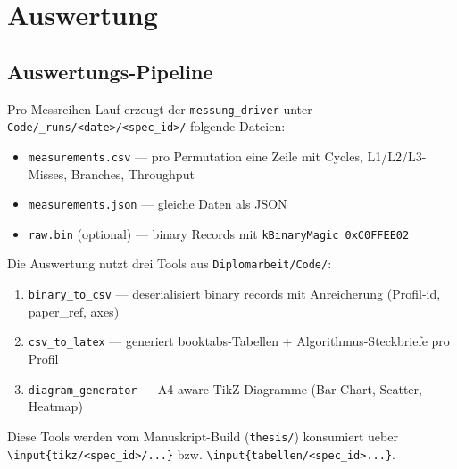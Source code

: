 \chapter{Auswertung}\label{ch:auswertung}



\section{Auswertungs-Pipeline}

Pro Messreihen-Lauf erzeugt der \texttt{messung\_driver} unter
\texttt{Code/\_runs/<date>/<spec\_id>/} folgende Dateien:

\begin{itemize}
    \item \texttt{measurements.csv} --- pro Permutation eine Zeile mit
          Cycles, L1/L2/L3-Misses, Branches, Throughput
    \item \texttt{measurements.json} --- gleiche Daten als JSON
    \item \texttt{raw.bin} (optional) --- binary Records mit
          \texttt{kBinaryMagic 0xC0FFEE02}
\end{itemize}

Die Auswertung nutzt drei Tools aus \texttt{Diplomarbeit/Code/}:

\begin{enumerate}
    \item \texttt{binary\_to\_csv} --- deserialisiert binary records
          mit Anreicherung (Profil-id, paper\_ref, axes)
    \item \texttt{csv\_to\_latex} --- generiert booktabs-Tabellen +
          Algorithmus-Steckbriefe pro Profil
    \item \texttt{diagram\_generator} --- A4-aware TikZ-Diagramme
          (Bar-Chart, Scatter, Heatmap)
\end{enumerate}

Diese Tools werden vom Manuskript-Build (\texttt{thesis/}) konsumiert
ueber \texttt{\textbackslash input\{tikz/<spec\_id>/...\}} bzw.
\texttt{\textbackslash input\{tabellen/<spec\_id>...\}}.

